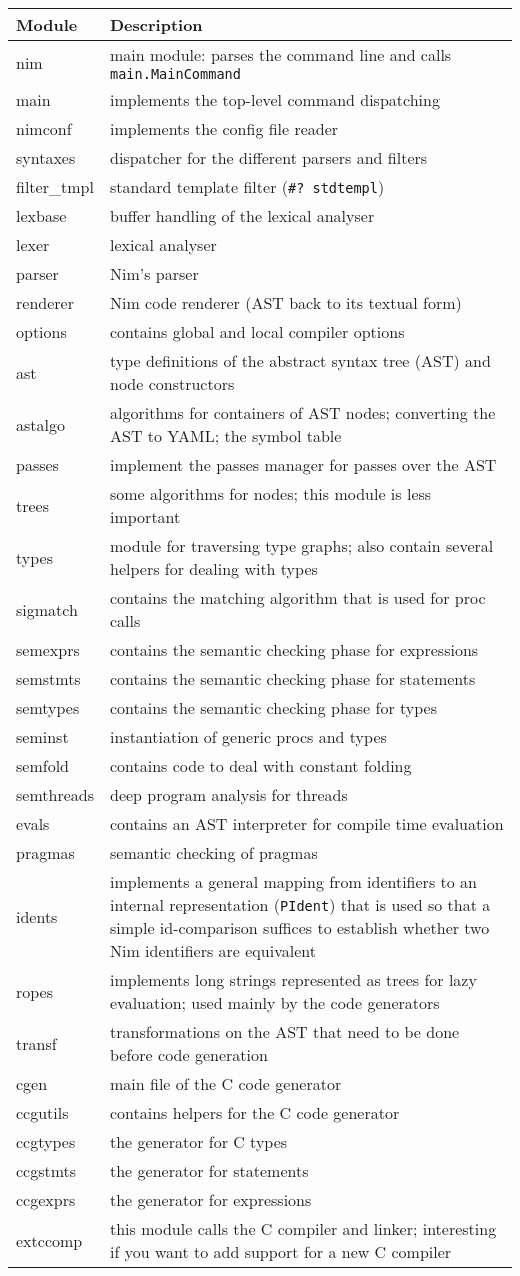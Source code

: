 \begin{longtable}[]{@{}ll@{}}
\toprule
Module & Description\tabularnewline
\midrule
\endhead
nim & main module: parses the command line and calls
\texttt{main.MainCommand}\tabularnewline
main & implements the top-level command dispatching\tabularnewline
nimconf & implements the config file reader\tabularnewline
syntaxes & dispatcher for the different parsers and
filters\tabularnewline
filter\_tmpl & standard template filter
(\texttt{\#?\ stdtempl})\tabularnewline
lexbase & buffer handling of the lexical analyser\tabularnewline
lexer & lexical analyser\tabularnewline
parser & Nim's parser\tabularnewline
renderer & Nim code renderer (AST back to its textual
form)\tabularnewline
options & contains global and local compiler options\tabularnewline
ast & type definitions of the abstract syntax tree (AST) and node
constructors\tabularnewline
astalgo & algorithms for containers of AST nodes; converting the AST to
YAML; the symbol table\tabularnewline
passes & implement the passes manager for passes over the
AST\tabularnewline
trees & some algorithms for nodes; this module is less
important\tabularnewline
types & module for traversing type graphs; also contain several helpers
for dealing with types\tabularnewline
sigmatch & contains the matching algorithm that is used for proc
calls\tabularnewline
semexprs & contains the semantic checking phase for
expressions\tabularnewline
semstmts & contains the semantic checking phase for
statements\tabularnewline
semtypes & contains the semantic checking phase for types\tabularnewline
seminst & instantiation of generic procs and types\tabularnewline
semfold & contains code to deal with constant folding\tabularnewline
semthreads & deep program analysis for threads\tabularnewline
evals & contains an AST interpreter for compile time
evaluation\tabularnewline
pragmas & semantic checking of pragmas\tabularnewline
idents & implements a general mapping from identifiers to an internal
representation (\texttt{PIdent}) that is used so that a simple
id-comparison suffices to establish whether two Nim identifiers are
equivalent\tabularnewline
ropes & implements long strings represented as trees for lazy
evaluation; used mainly by the code generators\tabularnewline
transf & transformations on the AST that need to be done before code
generation\tabularnewline
cgen & main file of the C code generator\tabularnewline
ccgutils & contains helpers for the C code generator\tabularnewline
ccgtypes & the generator for C types\tabularnewline
ccgstmts & the generator for statements\tabularnewline
ccgexprs & the generator for expressions\tabularnewline
extccomp & this module calls the C compiler and linker; interesting if
you want to add support for a new C compiler\tabularnewline
\bottomrule
\end{longtable}

